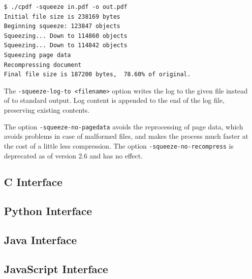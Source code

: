 \documentclass{book}
\begin{document}
\begin{verbatim}
$ ./cpdf -squeeze in.pdf -o out.pdf
Initial file size is 238169 bytes
Beginning squeeze: 123847 objects
Squeezing... Down to 114860 objects
Squeezing... Down to 114842 objects
Squeezing page data
Recompressing document
Final file size is 187200 bytes,  78.60% of original.
\end{verbatim}

\noindent The \texttt{-squeeze-log-to <filename>} option writes the log to the given file instead of to standard output. Log content is appended to the end of the log file, preserving existing contents.

The option \texttt{-squeeze-no-pagedata} avoids the reprocessing of page data, which avoids problems in case of malformed files, and makes the process much faster at the cost of a little less compression. The option \texttt{-squeeze-no-recompress} is deprecated as of version 2.6 and has no effect.

\begin{cpdflib}
\clearpage
\section*{C Interface}
\begin{small}\tt

\end{small}
\end{cpdflib}

\begin{pycpdflib}
\clearpage
\section*{Python Interface}
\begin{small}\tt

\end{small}
\end{pycpdflib}

\begin{jcpdflib}
\clearpage
\section*{Java Interface}
\begin{small}\tt

\end{small}
\end{jcpdflib}

\begin{jscpdflib}
\clearpage
\section*{JavaScript Interface}
\begin{small}\tt

\end{small}
\end{jscpdflib}
\end{document}
